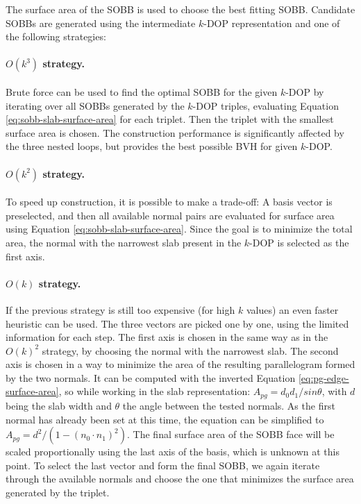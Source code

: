 The surface area of the SOBB is used to choose the best fitting SOBB. Candidate SOBBs are generated using the intermediate $k$-DOP representation and one of the following strategies:

\paragraph{$O(k^3)$ strategy.} Brute force can be used to find the optimal SOBB for the given $k$-DOP by iterating over all SOBBs generated by the $k$-DOP triples, evaluating Equation \ref{eq:sobb-slab-surface-area} for each triplet. Then the triplet with the smallest surface area is chosen. The construction performance is significantly affected by the three nested loops, but provides the best possible BVH for given $k$-DOP. \cite{KB25}

\paragraph{$O(k^2)$ strategy.} To speed up construction, it is possible to make a trade-off: A basis vector is preselected, and then all available normal pairs are evaluated for surface area using Equation \ref{eq:sobb-slab-surface-area}. Since the goal is to minimize the total area, the normal with the narrowest slab present in the $k$-DOP is selected as the first axis. \cite{KB25}

\paragraph{$O(k)$ strategy.} If the previous strategy is still too expensive (for high $k$ values) an even faster heuristic can be used. The three vectors are picked one by one, using the limited information for each step. The first axis is chosen in the same way as in the $O(k)^2$ strategy, by choosing the normal with the narrowest slab. The second axis is chosen in a way to minimize the area of the resulting parallelogram formed by the two normals. It can be computed with the inverted Equation \ref{eq:pg-edge-surface-area}, so while working in the slab representation: $A_{pg} = d_0d_1 / sin\theta$, with $d$ being the slab width and $\theta$ the angle between the tested normals. As the first normal has already been set at this time, the equation can be simplified to $A_{pg} = d^2 / (1 - (n_0 \cdot n_1)^2)$. The final surface area of the SOBB face will be scaled proportionally using the last axis of the basis, which is unknown at this point. To select the last vector and form the final SOBB, we again iterate through the available normals and choose the one that minimizes the surface area generated by the triplet. \cite{KB25}

